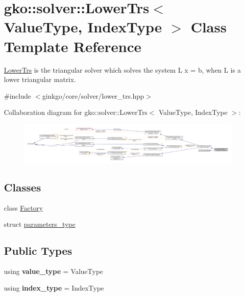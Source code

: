 \hypertarget{classgko_1_1solver_1_1LowerTrs}{}\section{gko\+:\+:solver\+:\+:Lower\+Trs$<$ Value\+Type, Index\+Type $>$ Class Template Reference}
\label{classgko_1_1solver_1_1LowerTrs}


\hyperlink{classgko_1_1solver_1_1LowerTrs}{Lower\+Trs} is the triangular solver which solves the system L x = b, when L is a lower triangular matrix.  




{\ttfamily \#include $<$ginkgo/core/solver/lower\+\_\+trs.\+hpp$>$}



Collaboration diagram for gko\+:\+:solver\+:\+:Lower\+Trs$<$ Value\+Type, Index\+Type $>$\+:
\nopagebreak
\begin{figure}[H]
\begin{center}
\leavevmode
\includegraphics[width=350pt]{classgko_1_1solver_1_1LowerTrs__coll__graph}
\end{center}
\end{figure}
\subsection*{Classes}
\begin{DoxyCompactItemize}
\item 
class \hyperlink{classgko_1_1solver_1_1LowerTrs_1_1Factory}{Factory}
\item 
struct \hyperlink{structgko_1_1solver_1_1LowerTrs_1_1parameters__type}{parameters\+\_\+type}
\end{DoxyCompactItemize}
\subsection*{Public Types}
\begin{DoxyCompactItemize}
\item 
\mbox{\label{classgko_1_1solver_1_1LowerTrs_af9fd3dacca99c98ff60f8b298c0203d4}} 
using {\bfseries value\+\_\+type} = Value\+Type
\item 
\mbox{\label{classgko_1_1solver_1_1LowerTrs_af62154ef2a638549c3b445a011c0d26a}} 
using {\bfseries index\+\_\+type} = Index\+Type
\end{DoxyCompactItemize}
